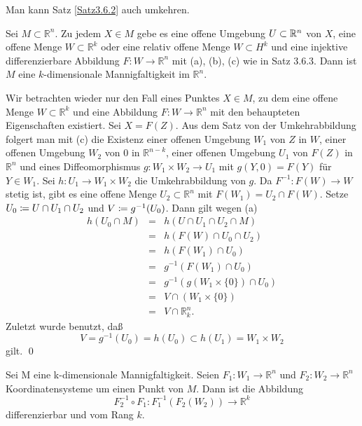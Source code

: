 \documentclass[a4paper,twoside,DIV15,BCOR12mm]{scrbook}
\begin{document}
\bigskip

\noindent
Man kann Satz \ref{Satz3.6.2} auch umkehren.

\bigskip

\begin{satz}\label{Satz3.6.3} {Sei $M \subset {\mathbb R}^{n}$. Zu 
jedem $X \in M$ gebe es eine offene Umgebung $U\subset\mathbb{R}^n$ von $X$, eine offene 
Menge $W \subset {\mathbb R}^{k}$ oder eine relativ offene Menge $W 
\subset H^{k}$ und eine injektive differenzierbare Abbildung $F: W 
\to {\mathbb R}^{n}$ mit (a), (b), (c) wie in Satz 3.6.3. Dann ist $M$ 
eine $k$-dimensionale Mannigfaltigkeit im ${\mathbb R}^{n}$.}
\end{satz}

\bigskip

 Wir betrachten wieder nur den Fall eines 
Punktes $X \in M$, zu dem eine offene Menge $W \subset {\mathbb 
R}^{k}$ und eine Abbildung $F: W \to {\mathbb R}^{n}$ mit den 
behaupteten Eigenschaften existiert. Sei $X = F(Z)$. Aus dem Satz von 
der Umkehrabbildung folgert man mit (c) die Existenz einer offenen Umgebung 
$W_{1}$ von $Z$ in $W$, einer offenen Umgebung $W_{2}$ von 0 in 
${\mathbb R}^{n-k}$, einer offenen Umgebung $U_{1}$ von $F(Z)$ in 
${\mathbb R}^{n}$ und eines Diffeomorphismus $g: W_{1} \times W_{2} 
\to U_{1}$ mit $g(Y,0) = F(Y)$ für $Y \in W_{1}$. Sei $h: U_{1} \to 
W_{1} \times W_{2}$ die Umkehrabbildung von $g$. Da $F^{-1}: F(W) \to 
W$ stetig ist, gibt es eine offene Menge $U_{2} \subset {\mathbb 
R}^{n}$ mit $F(W_{1}) = U_{2} \cap F(W)$. Setze $U_{0}\da  U \cap U_{1} 
\cap U_{2}$ und $V \da  g^{-1}(U_{0})$. Dann gilt wegen (a)
\begin{eqnarray*}
h(U_{0} \cap M) & = & h(U \cap U_{1} \cap U_{2} \cap M) \\
& = & h(F(W) \cap U_{0} \cap U_{2}) \\
& = & h(F(W_{1}) \cap U_{0}) \\
& = & g^{-1}(F(W_{1}) \cap U_{0}) \\
& = & g^{-1}(g(W_{1} \times \{0\}) \cap U_{0}) \\
& = & V \cap (W_{1} \times \{0\}) \\
& = & V \cap {\mathbb R}_{k}^{n}.
\end{eqnarray*}
Zuletzt wurde benutzt, daß 
\[V=g^{-1}(U_0)=h(U_0)\subset h(U_1)= W_1\times W_2\]
gilt.
\qed\\

\bigskip

\begin{satz}\label{Satz3.6.4} {Sei M eine k-dimensionale 
Mannigfaltigkeit. Seien $F_{1} : W_{1} \to {\mathbb R}^{n}$ und 
$F_{2}: W_{2} \to {\mathbb R}^{n}$ Koordinatensysteme um einen Punkt 
von $M$. Dann ist die Abbildung
\[ F_{2}^{-1} \circ F_{1}: F_{1}^{-1}(F_{2}(W_{2})) \to {\mathbb 
R}^{k} \]
differenzierbar und vom Rang $k$.}
\end{satz}
\end{document}
